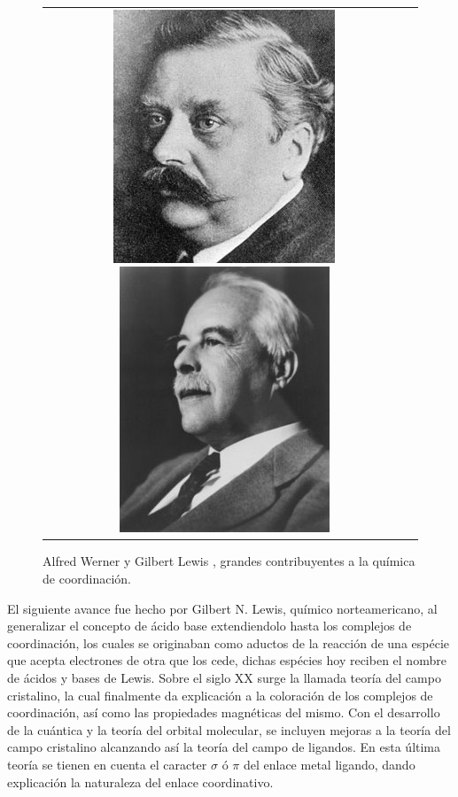 \documentclass[fleqn,10pt]{SelfArx} %
\begin{document}
	\begin{figure}[h]
		\centering
		\begin{tabular}{cc}
			\includegraphics[width=0.5\linewidth]{images/werner.jpg}
			\includegraphics[width=0.452\linewidth]{images/lewis.jpg}
		\end{tabular}
		\caption{Alfred Werner \cite{Werner} y Gilbert Lewis \cite{Lewis}, grandes contribuyentes a la qu\'imica de coordinaci\'on.}
	\end{figure}
	
	El siguiente avance fue hecho por Gilbert N. Lewis, qu\'imico norteamericano, al generalizar el concepto de \'acido base extendiendolo hasta los complejos de coordinaci\'on, los cuales se originaban como aductos de la reacci\'on de una esp\'ecie que acepta electrones de otra que los cede, dichas esp\'ecies hoy reciben el nombre de \'acidos y bases de Lewis. Sobre el siglo XX surge la llamada teor\'ia del campo cristalino, la cual finalmente da explicaci\'on a la coloraci\'on de los complejos de coordinaci\'on, as\'i como las propiedades magn\'eticas del mismo. Con el desarrollo de la cu\'antica y la teor\'ia del orbital molecular, se incluyen mejoras a la teor\'ia del campo cristalino alcanzando as\'i la teor\'ia del campo de ligandos. En esta \'ultima teor\'ia se tienen en cuenta el caracter $\sigma$ \'o $\pi$ del enlace metal ligando, dando explicaci\'on la naturaleza del enlace coordinativo.
	
\end{document}
